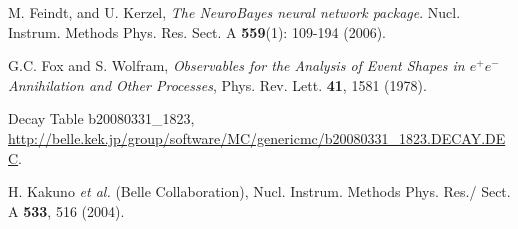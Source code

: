 \documentclass[aps,prl,twocolumn,superscriptaddress,showpacs,preprintnumbers,amsmath,amssymb]{revtex4}
\begin{document}
\begin{thebibliography}{99}
M. Feindt, and U. Kerzel, \emph{The NeuroBayes neural network package}. Nucl. Instrum. Methods Phys. Res. Sect. A \textbf{559}(1): 109-194 (2006).

G.C. Fox and S. Wolfram, \emph{Observables for the Analysis of Event Shapes in $e^+ e^-$ Annihilation and Other Processes}, Phys. Rev. Lett. \textbf{41}, 1581 (1978).

Decay Table b20080331\_1823,  \url{http://belle.kek.jp/group/software/MC/genericmc/b20080331_1823.DECAY.DEC}.

H. Kakuno \textit{et al.} (Belle Collaboration), Nucl. Instrum. Methods Phys. Res./ Sect. A \textbf{533}, 516 (2004).

\end{thebibliography}
%
\end{document}
